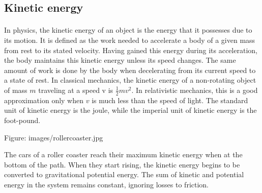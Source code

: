 \documentclass{book}
\begin{document}
	\begin{landscape}
		\section{Kinetic energy}
		\paragraph{}
		In physics, the kinetic energy of an object is the energy that it possesses due to its motion. It is defined as the work needed to accelerate a body of a given mass from rest to its stated velocity. Having gained this energy during its acceleration, the body maintains this kinetic energy unless its speed changes. The same amount of work is done by the body when decelerating from its current speed to a state of rest. In classical mechanics, the kinetic energy of a non-rotating object of mass $m$ traveling at a speed v is $\frac{1}{2} m v^2$. In relativistic mechanics, this is a good approximation only when $v$ is much less than the speed of light. The standard unit of kinetic energy is the joule, while the imperial unit of kinetic energy is the foot-pound.
		
		Figure: images/rollercoaster.jpg
		
		The cars of a roller coaster reach their maximum kinetic energy when at the bottom of the path. When they start rising, the kinetic energy begins to be converted to gravitational potential energy. The sum of kinetic and potential energy in the system remains constant, ignoring losses to friction.
	\end{landscape}
	
\end{document}
